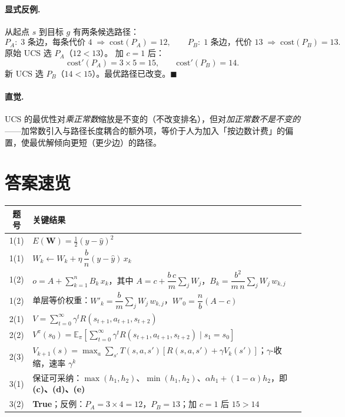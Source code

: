 \documentclass[12pt]{article}
\newcommand{\E}{\mathbb{E}}
\begin{document}
\paragraph{显式反例.}
从起点 $s$ 到目标 $g$ 有两条候选路径：
\[
P_A\!:\;\text{$3$ 条边，每条代价 $4$}\;\Longrightarrow\;\mathrm{cost}(P_A)=12,
\qquad
P_B\!:\;\text{$1$ 条边，代价 $13$}\;\Longrightarrow\;\mathrm{cost}(P_B)=13.
\]
原始 UCS 选 $P_A$（$12<13$）。
加 $c=1$ 后：
\[
\mathrm{cost}'(P_A)=3\times 5=15,\qquad
\mathrm{cost}'(P_B)=14.
\]
新 UCS 选 $P_B$（$14<15$）。最优路径已改变。$\blacksquare$

\paragraph{直觉.}
UCS 的最优性对\emph{乘正常数}缩放是不变的（不改变排名），但对\emph{加正常数不是不变的}——加常数引入与路径长度耦合的额外项，等价于人为加入「按边数计费」的偏置，使最优解倾向更短（更少边）的路径。

\newpage
\section*{答案速览}

\begin{table}[h]
\centering
\renewcommand{\arraystretch}{1.6}
\begin{tabular}{cl}
\toprule
\textbf{题号} & \textbf{关键结果}\\
\midrule
1(1) & $E(\mathbf{W})=\tfrac12(y-\hat{y})^{2}$\\
1(1) & $W_k\leftarrow W_k+\eta\,\dfrac{b}{n}(y-\hat{y})\,x_k$\\
1(2) & $o = A+\sum_{k=1}^{n}B_k\,x_k$，其中 $A=c+\dfrac{b\,c}{m}\sum_j W_j$，$B_k=\dfrac{b^{2}}{m\,n}\sum_j W_j\,w_{k,j}$\\
1(2) & 单层等价权重：$W'_k=\dfrac{b}{m}\sum_j W_j\,w_{k,j}$，$W'_0=\dfrac{n}{b}(A-c)$\\
2(1) & $V=\sum_{t=0}^{\infty}\gamma^{t}R(s_{t+1},a_{t+1},s_{t+2})$\\
2(2) & $V^{\pi}(s_0)=\E_{\pi}\!\left[\sum_{t=0}^{\infty}\gamma^{t}R(s_{t+1},a_{t+1},s_{t+2})\mid s_1=s_0\right]$\\
2(3) & $V_{k+1}(s)=\max_a\sum_{s'} T(s,a,s')[R(s,a,s')+\gamma V_k(s')]$；$\gamma$-收缩，速率 $\gamma^k$\\
3(1) & 保证可采纳：$\max(h_1,h_2)$、$\min(h_1,h_2)$、$\alpha h_1+(1-\alpha)h_2$，即 \textbf{(c)、(d)、(e)}\\
3(2) & \textbf{True}；反例：$P_A=3\times 4=12$，$P_B=13$；加 $c=1$ 后 $15>14$\\
\bottomrule
\end{tabular}
\end{table}
\end{document}
